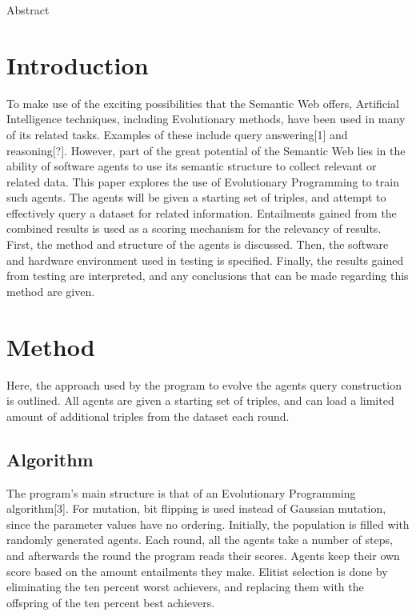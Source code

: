 \documentclass[thesis,12pt]{article}
\begin{document}
Abstract

\section{Introduction}
To make use of the exciting possibilities that the Semantic Web offers, Artificial Intelligence techniques, including Evolutionary methods, have been used in many of its related tasks. Examples of these include query answering[1] and reasoning[?]. However, part of the great potential of the Semantic Web lies in the ability of software agents to use its semantic structure to collect relevant or related data. This paper explores the use of Evolutionary Programming to train such agents. The agents will be given a starting set of triples, and attempt to effectively query a dataset for related information. Entailments gained from the combined results is used as a scoring mechanism for the relevancy of results. 
First, the method and structure of the agents is discussed. Then, the software and hardware environment used in testing is specified. Finally, the results gained from testing are interpreted, and any conclusions that can be made regarding this method are given.

\section{Method}

Here, the approach used by the program to evolve the agents query construction is outlined. All agents are given a starting set of triples, and can load a limited amount of additional triples from the dataset each round. 

\subsection{Algorithm}
The program's main structure is that of an Evolutionary Programming algorithm[3]. For mutation, bit flipping is used instead of Gaussian mutation, since the parameter values have no ordering. Initially, the population is filled with randomly generated agents. Each round, all the agents take a number of steps, and afterwards the round the program reads their scores. Agents keep their own score based on the amount entailments they make. Elitist selection is done by eliminating the ten percent worst achievers, and replacing them with the offspring of the ten percent best achievers. 
\end{document}
